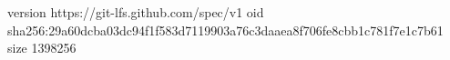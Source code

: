 version https://git-lfs.github.com/spec/v1
oid sha256:29a60dcba03dc94f1f583d7119903a76c3daaea8f706fe8cbb1c781f7e1c7b61
size 1398256
